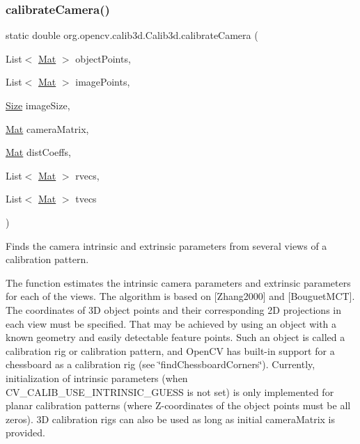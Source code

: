 \subsubsection{\texorpdfstring{calibrate\+Camera()}{calibrateCamera()}\hspace{0.1cm}{\footnotesize\ttfamily [3/3]}}
{\footnotesize\ttfamily static double org.\+opencv.\+calib3d.\+Calib3d.\+calibrate\+Camera (\begin{DoxyParamCaption}\item[{List$<$ \mbox{\hyperlink{classorg_1_1opencv_1_1core_1_1_mat}{Mat}} $>$}]{object\+Points,  }\item[{List$<$ \mbox{\hyperlink{classorg_1_1opencv_1_1core_1_1_mat}{Mat}} $>$}]{image\+Points,  }\item[{\mbox{\hyperlink{classorg_1_1opencv_1_1core_1_1_size}{Size}}}]{image\+Size,  }\item[{\mbox{\hyperlink{classorg_1_1opencv_1_1core_1_1_mat}{Mat}}}]{camera\+Matrix,  }\item[{\mbox{\hyperlink{classorg_1_1opencv_1_1core_1_1_mat}{Mat}}}]{dist\+Coeffs,  }\item[{List$<$ \mbox{\hyperlink{classorg_1_1opencv_1_1core_1_1_mat}{Mat}} $>$}]{rvecs,  }\item[{List$<$ \mbox{\hyperlink{classorg_1_1opencv_1_1core_1_1_mat}{Mat}} $>$}]{tvecs }\end{DoxyParamCaption})\hspace{0.3cm}{\ttfamily [static]}}

Finds the camera intrinsic and extrinsic parameters from several views of a calibration pattern.

The function estimates the intrinsic camera parameters and extrinsic parameters for each of the views. The algorithm is based on \mbox{[}Zhang2000\mbox{]} and \mbox{[}Bouguet\+M\+CT\mbox{]}. The coordinates of 3D object points and their corresponding 2D projections in each view must be specified. That may be achieved by using an object with a known geometry and easily detectable feature points. Such an object is called a calibration rig or calibration pattern, and Open\+CV has built-\/in support for a chessboard as a calibration rig (see \char`\"{}find\+Chessboard\+Corners\char`\"{}). Currently, initialization of intrinsic parameters (when {\ttfamily C\+V\+\_\+\+C\+A\+L\+I\+B\+\_\+\+U\+S\+E\+\_\+\+I\+N\+T\+R\+I\+N\+S\+I\+C\+\_\+\+G\+U\+E\+SS} is not set) is only implemented for planar calibration patterns (where Z-\/coordinates of the object points must be all zeros). 3D calibration rigs can also be used as long as initial {\ttfamily camera\+Matrix} is provided.

